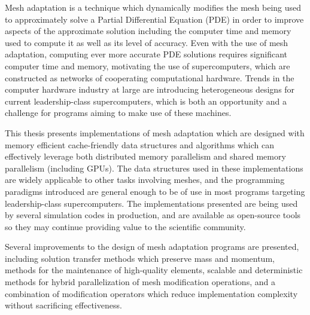 

Mesh adaptation is a technique which dynamically modifies the
mesh being used to approximately solve a Partial Differential
Equation (PDE) in order to improve aspects of the approximate solution
including the computer time and memory used to compute it
as well as its level of accuracy.
Even with the use of mesh adaptation, computing ever more accurate
PDE solutions requires significant computer time and memory,
motivating the use of supercomputers, which are constructed as
networks of cooperating computational hardware.
Trends in the computer hardware industry at large are introducing
heterogeneous designs for current leadership-class supercomputers,
which is both an opportunity and a challenge for programs
aiming to make use of these machines.

This thesis presents implementations of mesh adaptation
which are designed with memory efficient cache-friendly
data structures and algorithms which can effectively leverage
both distributed memory parallelism and shared memory
parallelism (including GPUs).
The data structures used in these implementations are widely
applicable to other tasks involving meshes, and the programming
paradigms introduced are general enough to be of use in most
programs targeting leadership-class supercomputers.
The implementations presented are being used by
several simulation codes in production, and are available
as open-source tools so they may continue providing value
to the scientific community.

Several improvements to the design of mesh adaptation programs
are presented, including solution transfer methods which
preserve mass and momentum, methods for the maintenance of
high-quality elements, scalable and deterministic methods
for hybrid parallelization of mesh modification operations,
and a combination of modification operators which reduce
implementation complexity without sacrificing effectiveness.
